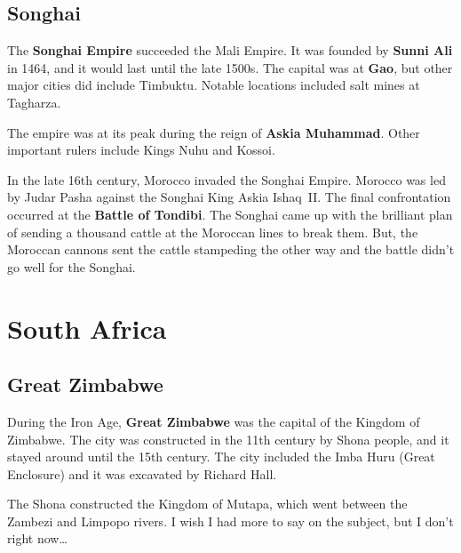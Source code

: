 \subsection*{Songhai}

The \textbf{Songhai Empire} succeeded the Mali Empire.
It was founded by \textbf{Sunni Ali} in 1464, and it would last until the late 1500s.
The capital was at \textbf{Gao}, but other major cities did include Timbuktu.
Notable locations included salt mines at Tagharza.

The empire was at its peak during the reign of \textbf{Askia Muhammad}.
Other important rulers include Kings Nuhu and Kossoi.

In the late 16th century, Morocco invaded the Songhai Empire.
Morocco was led by Judar Pasha against the Songhai King Askia Ishaq~II\@.
The final confrontation occurred at the \textbf{Battle of Tondibi}.
The Songhai came up with the brilliant plan of sending a thousand cattle at the Moroccan lines to break them.
But, the Moroccan cannons sent the cattle stampeding the other way and the battle didn't go well for the Songhai.

\section{South Africa}

\subsection*{Great Zimbabwe}

During the Iron Age, \textbf{Great Zimbabwe} was the capital of the Kingdom of Zimbabwe.
The city was constructed in the 11th century by Shona people, and it stayed around until the 15th century.
The city included the Imba Huru (Great Enclosure) and it was excavated by Richard Hall.

The Shona constructed the Kingdom of Mutapa, which went between the Zambezi and Limpopo rivers.
I wish I had more to say on the subject, but I don't right now\ldots{}
